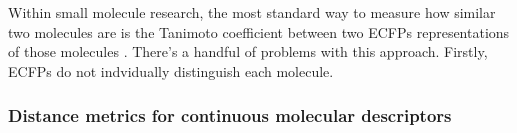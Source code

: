 %
%
%

Within small molecule research, the most standard way to measure how similar two molecules are is the Tanimoto coefficient between two ECFPs representations of those molecules \citep{Capecchi2020, LopezPerez2024}. There's a handful of problems with this approach. Firstly, ECFPs do not indvidually distinguish each molecule.

\subsubsection{Distance metrics for continuous molecular descriptors}
%
%

